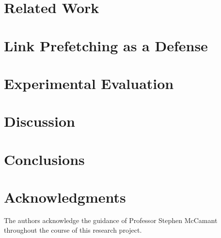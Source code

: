 \documentclass{sig-alternate-05-2015}
\begin{document}
\section{Related Work}


\section{Link Prefetching as a Defense}


\section{Experimental Evaluation}


\section{Discussion}


\section{Conclusions}



\section{Acknowledgments}
The authors acknowledge the guidance of Professor Stephen McCamant
throughout the course of this research project.



\end{document}
